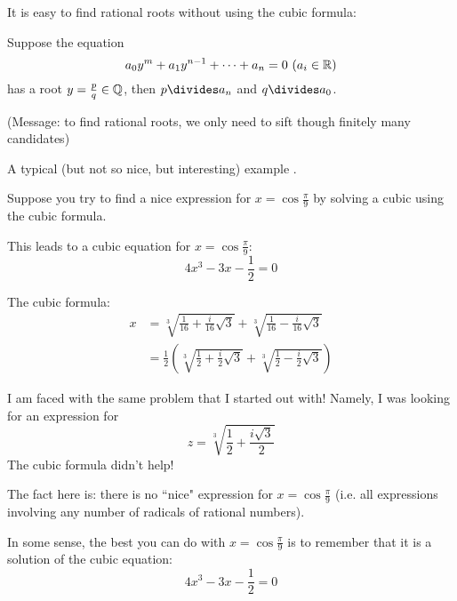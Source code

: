 \documentclass[twoside]{scrartcl}
\begin{document}
It is easy to find rational roots without using the cubic formula: 

\begin{proposition}
Suppose the equation
\[a_0y^m + a_1y^{n-1} +\dots + a_n = 0 ~(a_i \in \mathbb{R})\]	
has a root $y = \frac{p}{q} \in\mathbb{Q}$, then $p \divides a_n$ and $q \divides a_0$. 
\end{proposition}

(Message: to find rational roots, we only need to sift though finitely many candidates)\\


\begin{example}
A typical (but not so nice, but interesting) example	. 

Suppose you try to find a nice expression for $x = \cos\frac{\pi}{9}$ by solving a cubic using the cubic formula. 


\begin{center}
\end{center}


This leads to a cubic equation for $x = \cos\frac{\pi}{9}$: 
\[4x^3 - 3x - \frac{1}{2} = 0\]

The cubic formula: 
\[
\begin{aligned}
  x &= \sqrt[3]{\frac{1}{16} + \frac{i}{16}\sqrt{3}} + \sqrt[3]{\frac{1}{16} - \frac{i}{16}\sqrt{3}}\\
  &= \frac{1}{2}\left(\sqrt[3]{\frac{1}{2} + \frac{i}{2}\sqrt{3}} + \sqrt[3]{\frac{1}{2} - \frac{i}{2}\sqrt{3}} \right)
\end{aligned}
\]

I am faced with the same problem that I started out with! Namely, I was looking for an expression for 
\[z = \sqrt[3]{\frac{1}{2} + \frac{i\sqrt{3}}{2}}\]
The cubic formula didn't help!

The fact here is: there is no ``nice" expression for $x = \cos\frac{\pi}{9}$ (i.e. all expressions involving any number of radicals of rational numbers). 

In some sense, the best you can do with $x = \cos\frac{\pi}{9}$ is to remember that it is a solution of the cubic equation:
\[4x^3 -3x - \frac{1}{2} = 0\]
\end{example}\vspace*{10pt}
\end{document}
